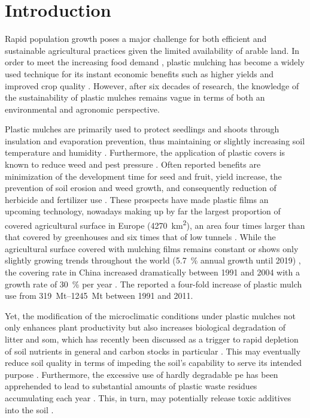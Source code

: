 \section{Introduction}
\label{sec:plastic-mulching:intro}

Rapid population growth poses a major challenge for both efficient and sustainable agricultural practices given the limited availability of arable land. In order to meet the increasing food demand \citep{GodfrayFood2010}, plastic mulching has become a widely used technique for its instant economic benefits such as higher yields and improved crop quality \citep{LamontPlastic1993}. However, after six decades of research, the knowledge of the sustainability of plastic mulches remains vague in terms of both an environmental and agronomic perspective.

Plastic mulches are primarily used to protect seedlings and shoots through insulation and evaporation prevention, thus maintaining or slightly increasing soil temperature and humidity \citep{TararaMicroclimate2000}. Furthermore, the application of plastic covers is known to reduce weed and pest pressure \citep{McKenzieLandscape2001}. Often reported benefits are minimization of the development time for seed and fruit, yield increase, the prevention of soil erosion and weed growth, and consequently reduction of herbicide and fertilizer use \citep{Chalker-ScottImpact2007,EspiPlastic2006,LamontPlastic1993, Scarascia-MugnozzaPlastic2011}. These prospects have made plastic films an upcoming technology, nowadays making up by far the largest proportion of covered agricultural surface
in Europe (\SI{4270}{\square\kilo\meter}), an area four times larger than that covered by greenhouses and six times that of low tunnels \citep{Scarascia-MugnozzaPlastic2011}. While the agricultural surface covered with mulching films remains constant or shows only slightly growing trends throughout the world (\SI{5.7}{\percent} annual growth until 2019) \citep{TransparencyMarketResearchAgricultural2013}, the covering rate in China increased dramatically between 1991 and 2004 with a growth rate of \SI{30}{\percent} per year \citep{EspiPlastic2006}. The \citet{NationalBureauofStatisticsofChinaChina2012} reported a four-fold increase of plastic mulch use from \SIrange[range-phrase = { to }]{319}{1245}{\mega\tonne} between 1991 and 2011.

Yet, the modification of the microclimatic conditions under plastic mulches not only enhances plant productivity but also increases biological degradation of litter and \ac{som}, which has recently been discussed as a trigger to rapid depletion of soil nutrients in general and carbon stocks in particular \citep{Domagala-SwiatkiewiczEffect2013,ZhangEffects2015}. This may eventually reduce soil quality in terms of impeding the soil's capability to serve its intended purpose \citep{DoranDefining1994}.
Furthermore, the excessive use of hardly degradable \ac{pe} has been apprehended to lead to substantial amounts of plastic waste residues accumulating each year \citep{AlbertssonMechanism1987}. This, in turn, may potentially release toxic additives into the soil \citep{RamosPolyethylene2015}.

